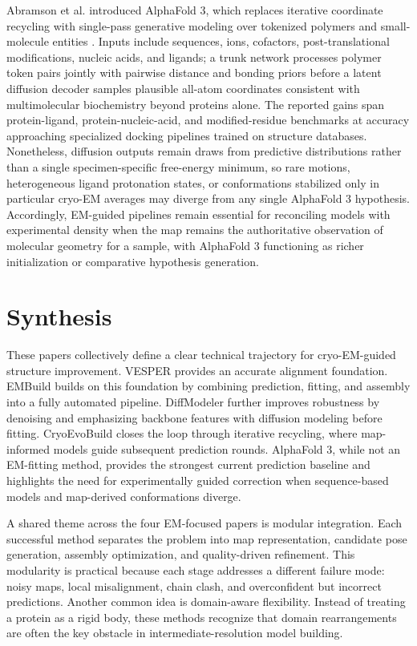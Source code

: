 \documentclass[12pt]{article}
\begin{document}
Abramson et al. introduced AlphaFold 3, which replaces iterative coordinate recycling with single-pass generative modeling over tokenized polymers and small-molecule entities \cite{abramson2024alphafold3}. Inputs include sequences, ions, cofactors, post-translational modifications, nucleic acids, and ligands; a trunk network processes polymer token pairs jointly with pairwise distance and bonding priors before a latent diffusion decoder samples plausible all-atom coordinates consistent with multimolecular biochemistry beyond proteins alone. The reported gains span protein-ligand, protein-nucleic-acid, and modified-residue benchmarks at accuracy approaching specialized docking pipelines trained on structure databases. Nonetheless, diffusion outputs remain draws from predictive distributions rather than a single specimen-specific free-energy minimum, so rare motions, heterogeneous ligand protonation states, or conformations stabilized only in particular cryo-EM averages may diverge from any single AlphaFold 3 hypothesis. Accordingly, EM-guided pipelines remain essential for reconciling models with experimental density when the map remains the authoritative observation of molecular geometry for a sample, with AlphaFold 3 functioning as richer initialization or comparative hypothesis generation.

\section{Synthesis}

These papers collectively define a clear technical trajectory for cryo-EM-guided structure improvement. VESPER provides an accurate alignment foundation. EMBuild builds on this foundation by combining prediction, fitting, and assembly into a fully automated pipeline. DiffModeler further improves robustness by denoising and emphasizing backbone features with diffusion modeling before fitting. CryoEvoBuild closes the loop through iterative recycling, where map-informed models guide subsequent prediction rounds. AlphaFold 3, while not an EM-fitting method, provides the strongest current prediction baseline and highlights the need for experimentally guided correction when sequence-based models and map-derived conformations diverge.

A shared theme across the four EM-focused papers is modular integration. Each successful method separates the problem into map representation, candidate pose generation, assembly optimization, and quality-driven refinement. This modularity is practical because each stage addresses a different failure mode: noisy maps, local misalignment, chain clash, and overconfident but incorrect predictions. Another common idea is domain-aware flexibility. Instead of treating a protein as a rigid body, these methods recognize that domain rearrangements are often the key obstacle in intermediate-resolution model building.
\end{document}
